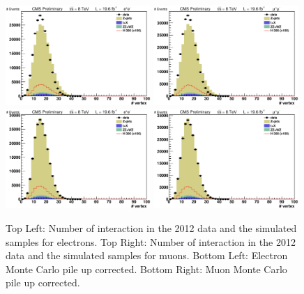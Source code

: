 \begin{figure}[htb]
\centering
\includegraphics[width=0.49\textwidth]{Selection/before_el_nvtx.eps}
\includegraphics[width=0.49\textwidth]{Selection/before_mu_nvtx.eps}\\
\includegraphics[width=0.49\textwidth]{Selection/after_el_nvtx.eps}
\includegraphics[width=0.49\textwidth]{Selection/after_mu_nvtx.eps}\\
\caption{Top Left: Number of interaction in the 2012 data and the simulated samples for electrons.  Top Right:  Number of interaction in the 2012 data and the simulated samples for muons. Bottom Left: Electron Monte Carlo pile up corrected. Bottom Right: Muon Monte Carlo pile up corrected.}
\label{fig:PileUp}
\end{figure}


